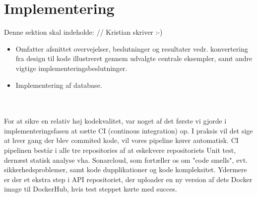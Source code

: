 \section{Implementering}
Denne sektion skal indeholde:
// Kristian skriver :-)
\begin{itemize}
    \item Omfatter afsnittet overvejelser, beslutninger og resultater vedr.  konvertering fra design til kode illustreret gennem udvalgte centrale eksempler, samt andre vigtige implementeringsbeslutninger. 
    \item Implementering af database.
\end{itemize}{}

\\

\\

For at sikre en relativ høj kodekvalitet, var noget af det første vi gjorde i implementeringsfasen at sætte CI (continous integration) op. I praksis vil det sige at hver gang der blev commited kode, vil vores pipeline kører automatisk. CI pipelinen består i alle tre repositories af at eskekvere repositoriets Unit test, dernæst statisk analyse vha. Sonarcloud, som fortæller os om "code smells", evt. sikkerhedsproblemer, samt kode dupplikationer og kode kompleksitet. Ydermere er der et ekstra step i API repositoriet, der uploader en ny version af dets Docker image til DockerHub, hvis test steppet kørte med succes.\\


